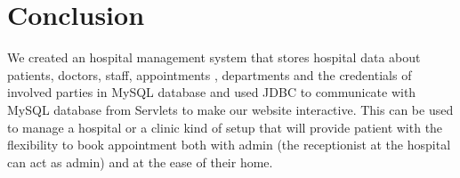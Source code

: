 \documentclass[12pt]{article}
\begin{document}
\section{Conclusion}

We created an hospital management system that stores hospital data about patients, doctors, staff, appointments , departments and the credentials of involved parties in MySQL database and used JDBC to communicate with MySQL database from Servlets to make our website interactive. This can be used to manage a hospital or a clinic kind of setup that will provide patient with the flexibility to book appointment both with admin (the receptionist at the hospital can act as admin) and at the ease of their home. 

\singlespacing
\newpage
\end{document}
